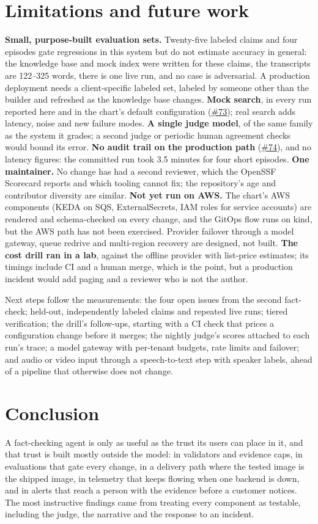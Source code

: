 \documentclass[11pt]{article}
\newcommand{\gh}[1]{\href{https://github.com/Organized-AI/podcast-agent/issues/#1}{\##1}}
\begin{document}
\section{Limitations and future work}\label{sec:limits}
\textbf{Small, purpose-built evaluation sets.} Twenty-five labeled claims and four episodes gate regressions in this system but do not estimate accuracy in general: the knowledge base and mock index were written for these claims, the transcripts are 122--325 words, there is one live run, and no case is adversarial. A production deployment needs a client-specific labeled set, labeled by someone other than the builder and refreshed as the knowledge base changes. \textbf{Mock search}, in every run reported here and in the chart's default configuration (\gh{73}); real search adds latency, noise and new failure modes. \textbf{A single judge model}, of the same family as the system it grades; a second judge or periodic human agreement checks would bound its error. \textbf{No audit trail on the production path} (\gh{74}), and no latency figures: the committed run took 3.5 minutes for four short episodes. \textbf{One maintainer.} No change has had a second reviewer, which the OpenSSF Scorecard reports and which tooling cannot fix; the repository's age and contributor diversity are similar. \textbf{Not yet run on AWS.} The chart's AWS components (KEDA on SQS, ExternalSecrets, IAM roles for service accounts) are rendered and schema-checked on every change, and the GitOps flow runs on kind, but the AWS path has not been exercised. Provider failover through a model gateway, queue redrive and multi-region recovery are designed, not built. \textbf{The cost drill ran in a lab}, against the offline provider with list-price estimates; its timings include CI and a human merge, which is the point, but a production incident would add paging and a reviewer who is not the author.

Next steps follow the measurements: the four open issues from the second fact-check; held-out, independently labeled claims and repeated live runs; tiered verification; the drill's follow-ups, starting with a CI check that prices a configuration change before it merges; the nightly judge's scores attached to each run's trace; a model gateway with per-tenant budgets, rate limits and failover; and audio or video input through a speech-to-text step with speaker labels, ahead of a pipeline that otherwise does not change.

\section{Conclusion}
A fact-checking agent is only as useful as the trust its users can place in it, and that trust is built mostly outside the model: in validators and evidence caps, in evaluations that gate every change, in a delivery path where the tested image is the shipped image, in telemetry that keeps flowing when one backend is down, and in alerts that reach a person with the evidence before a customer notices. The most instructive findings came from treating every component as testable, including the judge, the narrative and the response to an incident.
\end{document}
